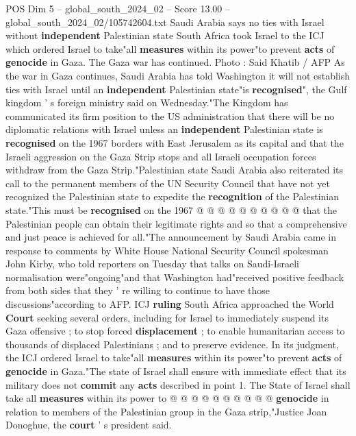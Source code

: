 \begin{textsample}{POS Dim 5 – global\_south\_2024\_02 – Score 13.00 – global\_south\_2024\_02/105742604.txt}  \label{ex:f5_pos_196}
Saudi Arabia says no ties with Israel without \textbf{independent} Palestinian state South Africa took Israel to the ICJ which ordered Israel to take"all \textbf{measures} within its power"to prevent \textbf{acts} of \textbf{genocide} in Gaza.
The Gaza war has continued.
Photo : Said Khatib / AFP As the war in Gaza continues, Saudi Arabia has told Washington it will not establish ties with Israel until an \textbf{independent} Palestinian state"is \textbf{recognised}", the Gulf kingdom ' s foreign ministry said on Wednesday."The Kingdom has communicated its firm position to the US administration that there will be no diplomatic relations with Israel unless an \textbf{independent} Palestinian state is \textbf{recognised} on the 1967 borders with East Jerusalem as its capital and that the Israeli aggression on the Gaza Strip stops and all Israeli occupation forces withdraw from the Gaza Strip."Palestinian state Saudi Arabia also reiterated its call to the permanent members of the UN Security Council that have not yet recognized the Palestinian state to expedite the \textbf{recognition} of the Palestinian state."This must be \textbf{recognised} on the 1967 @ @ @ @ @ @ @ @ @ @ that the Palestinian people can obtain their legitimate rights and so that a comprehensive and just peace is achieved for all."The announcement by Saudi Arabia came in response to comments by White House National Security Council spokesman John Kirby, who told reporters on Tuesday that talks on Saudi-Israeli normalisation were"ongoing"and that Washington had"received positive feedback from both sides that they ' re willing to continue to have those discussions"according to AFP.
ICJ \textbf{ruling} South Africa approached the World \textbf{Court} seeking several orders, including for Israel to immediately suspend its Gaza offensive ; to stop forced \textbf{displacement} ; to enable humanitarian access to thousands of displaced Palestinians ; and to preserve evidence.
In its judgment, the ICJ ordered Israel to take"all \textbf{measures} within its power"to prevent \textbf{acts} of \textbf{genocide} in Gaza."The state of Israel shall ensure with immediate effect that its military does not \textbf{commit} any \textbf{acts} described in point 1.
The State of Israel shall take all \textbf{measures} within its power to @ @ @ @ @ @ @ @ @ @ \textbf{genocide} in relation to members of the Palestinian group in the Gaza strip,"Justice Joan Donoghue, the \textbf{court} ' s president said.

\end{textsample}
